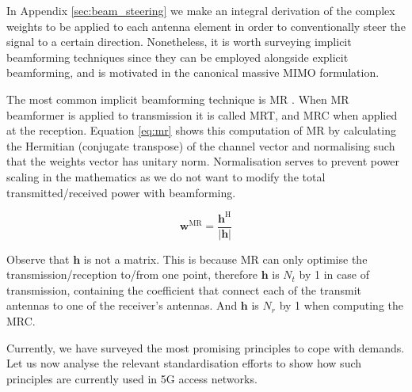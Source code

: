 
In Appendix \ref{sec:beam_steering} we make an integral derivation of the complex weights to be applied to each antenna element in order to conventionally steer the signal to a certain direction. Nonetheless, it is worth surveying implicit beamforming techniques since they can be employed alongside explicit beamforming, and is motivated in the canonical massive MIMO formulation.

The most common implicit beamforming technique is \ac{MR} \cite{795811}. When \ac{MR} beamformer is applied to transmission it is called \ac{MRT}, and \ac{MRC} when applied at the reception. Equation \ref{eq:mr} shows this computation of \ac{MR} by calculating the Hermitian (conjugate transpose) of the channel vector and normalising such that the weights vector has unitary norm. Normalisation serves to prevent power scaling in the mathematics as we do not want to modify the total transmitted/received power with beamforming.

\begin{equation} \label{eq:mr}
    \bm{w}^\text{MR} = \frac{\bm{h}^\text{H}}{|\bm{h}|}
\end{equation}

Observe that $\bm{h}$ is not a matrix. This is because \ac{MR} can only optimise the transmission/reception to/from one point, therefore $\bm{h}$ is $N_t$ by 1 in case of transmission, containing the coefficient that connect each of the transmit antennas to one of the receiver's antennas. And $\bm{h}$ is $N_r$ by 1 when computing the \ac{MRC}.

Currently, we have surveyed the most promising principles to cope with demands. Let us now analyse the relevant standardisation efforts to show how such principles are currently used in 5G access networks.
